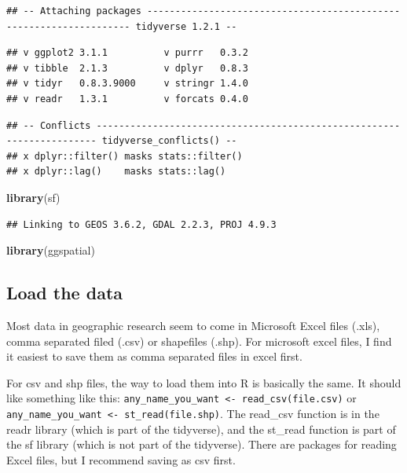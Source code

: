 \documentclass[]{article}
\newenvironment{Shaded}{\begin{snugshade}}{\end{snugshade}}
\newcommand{\KeywordTok}[1]{\textcolor[rgb]{0.13,0.29,0.53}{\textbf{#1}}}
\newcommand{\NormalTok}[1]{#1}
\begin{document}
\begin{verbatim}
## -- Attaching packages ------------------------------------------------------------------- tidyverse 1.2.1 --
\end{verbatim}

\begin{verbatim}
## v ggplot2 3.1.1          v purrr   0.3.2     
## v tibble  2.1.3          v dplyr   0.8.3     
## v tidyr   0.8.3.9000     v stringr 1.4.0     
## v readr   1.3.1          v forcats 0.4.0
\end{verbatim}

\begin{verbatim}
## -- Conflicts ---------------------------------------------------------------------- tidyverse_conflicts() --
## x dplyr::filter() masks stats::filter()
## x dplyr::lag()    masks stats::lag()
\end{verbatim}

\begin{Shaded}
\begin{Highlighting}[]
\KeywordTok{library}\NormalTok{(sf)}
\end{Highlighting}
\end{Shaded}

\begin{verbatim}
## Linking to GEOS 3.6.2, GDAL 2.2.3, PROJ 4.9.3
\end{verbatim}

\begin{Shaded}
\begin{Highlighting}[]
\KeywordTok{library}\NormalTok{(ggspatial)}
\end{Highlighting}
\end{Shaded}

\hypertarget{load-the-data}{%
\subsection{Load the data}\label{load-the-data}}

Most data in geographic research seem to come in Microsoft Excel files
(.xls), comma separated filed (.csv) or shapefiles (.shp). For microsoft
excel files, I find it easiest to save them as comma separated files in
excel first.

For csv and shp files, the way to load them into R is basically the
same. It should like something like this:
\texttt{any\_name\_you\_want\ \textless{}-\ read\_csv(\textquotesingle{}file.csv\textquotesingle{})}
or
\texttt{any\_name\_you\_want\ \textless{}-\ st\_read(\textquotesingle{}file.shp\textquotesingle{})}.
The read\_csv function is in the readr library (which is part of the
tidyverse), and the st\_read function is part of the sf library (which
is not part of the tidyverse). There are packages for reading Excel
files, but I recommend saving as csv first.
\end{document}
